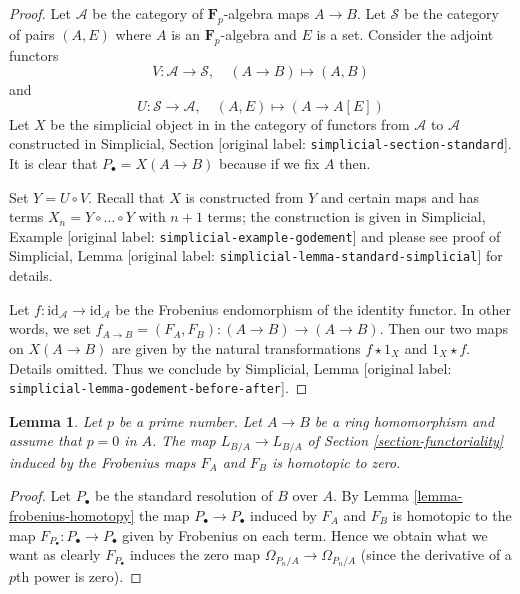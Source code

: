 \documentclass[10pt,a4paper]{article}
\theoremstyle{plain}
\newtheorem{lemma}[subsection]{Lemma}
\theoremstyle{definition}
\theoremstyle{remark}
\numberwithin{equation}{subsection}
\begin{document}
\begin{proof}
Let $\mathcal{A}$ be the category of $\mathbf{F}_p$-algebra maps
$A \to B$. Let $\mathcal{S}$ be the category of pairs $(A, E)$
where $A$ is an $\mathbf{F}_p$-algebra and $E$ is a set. Consider the
adjoint functors
$$
V : \mathcal{A} \to \mathcal{S}, \quad (A \to B) \mapsto (A, B)
$$
and
$$
U : \mathcal{S} \to \mathcal{A}, \quad (A, E) \mapsto (A \to A[E])
$$
Let $X$ be the simplicial object in 
in the category of functors from $\mathcal{A}$ to $\mathcal{A}$
constructed in Simplicial, Section \textnormal{[original label: \nolinkurl{simplicial-section-standard}]}.
It is clear that $P_\bullet = X(A \to B)$ because if we fix
$A$ then.

\medskip\noindent
Set $Y = U \circ V$. Recall that $X$ is constructed from $Y$
and certain maps and has terms $X_n = Y \circ \ldots \circ Y$
with $n + 1$ terms; the construction is given in
Simplicial, Example \textnormal{[original label: \nolinkurl{simplicial-example-godement}]} and please see
proof of Simplicial, Lemma \textnormal{[original label: \nolinkurl{simplicial-lemma-standard-simplicial}]}
for details.

\medskip\noindent
Let $f : \text{id}_\mathcal{A} \to \text{id}_\mathcal{A}$
be the Frobenius endomorphism of the identity functor.
In other words, we set $f_{A \to B} = (F_A, F_B) : (A \to B) \to (A \to B)$.
Then our two maps on $X(A \to B)$ are given by the natural transformations
$f \star 1_X$ and $1_X \star f$. Details omitted.
Thus we conclude by Simplicial, Lemma
\textnormal{[original label: \nolinkurl{simplicial-lemma-godement-before-after}]}.
\end{proof}

\begin{lemma}
\label{lemma-frobenius-acts-as-zero}
Let $p$ be a prime number. Let $A \to B$ be a ring homomorphism
and assume that $p = 0$ in $A$. The map $L_{B/A} \to L_{B/A}$
of Section \ref{section-functoriality} induced by the
Frobenius maps $F_A$ and $F_B$ is homotopic to zero.
\end{lemma}

\begin{proof}
Let $P_\bullet$ be the standard resolution of $B$ over $A$.
By Lemma \ref{lemma-frobenius-homotopy} the map $P_\bullet \to P_\bullet$
induced by $F_A$ and $F_B$ is homotopic to the map
$F_{P_\bullet} : P_\bullet \to P_\bullet$ given by
Frobenius on each term. Hence we obtain what we want as clearly
$F_{P_\bullet}$ induces the zero map $\Omega_{P_n/A} \to \Omega_{P_n/A}$
(since the derivative of a $p$th power is zero).
\end{proof}
\end{document}
